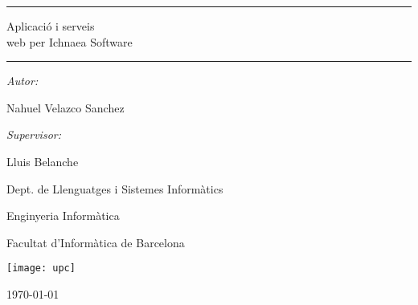 \begin{titlepage}

\begin{center}
\vspace{4 cm}

\hrule
\vspace{4 mm}
\huge{Aplicaci\'{o} i serveis \\
web per Ichnaea Software}
\vspace{4 mm}
\hrule

\vspace{2 cm}

\large{\emph{Autor:}}

\large{Nahuel Velazco Sanchez} \\

\vspace{1 cm}

\large{\emph{Supervisor:}}

\large{Lluis Belanche} \\

\vspace{1 cm}

\large{Dept. de Llenguatges i Sistemes Inform\`{a}tics} \\

\vspace{4 cm}

\large{Enginyeria Inform\`{a}tica} 

\large{Facultat d'Inform\`{a}tica de Barcelona} 

\vspace{1.5 cm}

\texttt{[image: upc]}

\vfill

\large{\today}

\end{center}

\end{titlepage}
